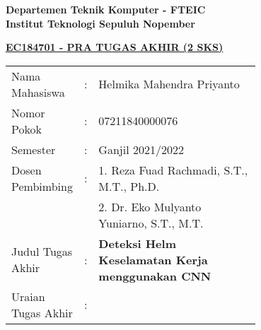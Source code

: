 \begin{flushleft}
  \textbf{Departemen Teknik Komputer - FTEIC}\\
  \textbf{Institut Teknologi Sepuluh Nopember}\\
\end{flushleft}


\begin{center}
  \underline{\textbf{EC184701 - PRA TUGAS AKHIR (2 SKS)}}
\end{center}

\begin{adjustwidth}{-0.2cm}{}
  \begin{tabular}{lcp{0.7\linewidth}}

    Nama Mahasiswa &:& Helmika Mahendra Priyanto \\
    Nomor Pokok &:& 07211840000076\\

    Semester &:& Ganjil 2021/2022 \\

    Dosen Pembimbing &:& 1. Reza Fuad Rachmadi, S.T., M.T., Ph.D. \\
    & & 2. Dr. Eko Mulyanto Yuniarno, S.T., M.T. \\

    Judul Tugas Akhir &:& \textbf{Deteksi Helm Keselamatan Kerja menggunakan CNN} \\

    Uraian Tugas Akhir &:& \\
  \end{tabular}
\end{adjustwidth}

